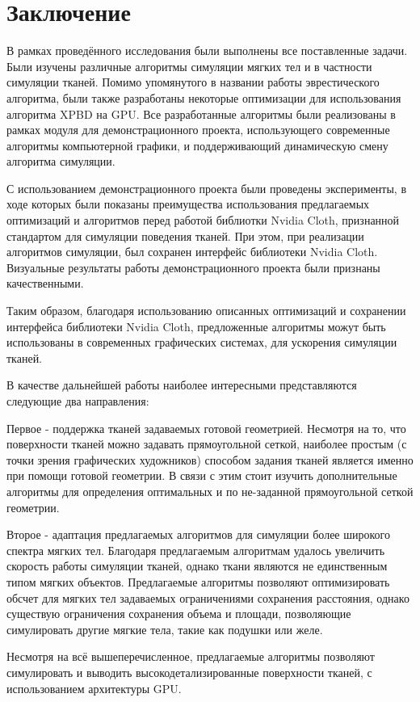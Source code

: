 \chapter*{Заключение} \label{ch-conclusion}
	В рамках проведённого исследования были выполнены все поставленные задачи. Были изучены различные алгоритмы симуляции мягких тел и в частности симуляции тканей. Помимо упомянутого в названии работы эврестического алгоритма, были также разработаны некоторые оптимизации для использования алгоритма XPBD на GPU. Все разработанные алгоритмы были реализованы в рамках модуля для демонстрационного проекта, использующего современные алгоритмы компьютерной графики, и поддерживающий динамическую смену алгоритма симуляции.
	
	С использованием демонстрационного проекта были проведены эксперименты, в ходе которых были показаны преимущества использования предлагаемых оптимизаций и алгоритмов перед работой библиотки Nvidia Cloth, признанной стандартом для симуляции поведения тканей. При этом, при реализации алгоритмов симуляции, был сохранен интерфейс библиотеки Nvidia Cloth. Визуальные результаты работы демонстрационного проекта были признаны качественными. 
	
	Таким образом, благодаря использованию описанных оптимизаций и сохранении интерфейса библиотеки Nvidia Cloth, предложенные алгоритмы можут быть использованы в современных графических системах, для ускорения симуляции тканей. 
	
	В качестве дальнейшей работы наиболее интересными представляются следующие два направления:
	
	Первое - поддержка тканей задаваемых готовой геометрией. Несмотря на то, что поверхности тканей можно задавать прямоугольной сеткой, наиболее простым (с точки зрения графических художников) способом задания тканей является именно при помощи готовой геометрии. В связи с этим стоит изучить дополнительные алгоритмы для определения оптимальных  и  по не-заданной прямоугольной сеткой геометрии.
	
	Второе - адаптация предлагаемых алгоритмов для симуляции более широкого спектра мягких тел. Благодаря предлагаемым алгоритмам удалось увеличить скорость работы симуляции тканей, однако ткани являются не единственным типом мягких объектов. Предлагаемые алгоритмы позволяют оптимизировать обсчет для мягких тел задаваемых ограничениями сохранения расстояния, однако существую ограничения сохранения объема и площади, позволяющие симулировать другие мягкие тела, такие как подушки или желе.
	
	Несмотря на всё вышеперечисленное, предлагаемые алгоритмы позволяют симулировать и выводить высокодетализированные поверхности тканей, с использованием архитектуры GPU.